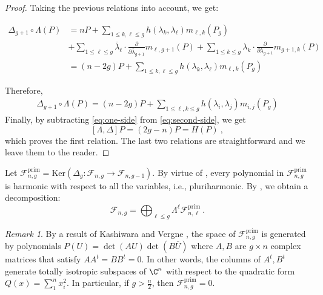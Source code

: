 \documentclass[11pt,letterpaper,english]{amsart}
\numberwithin{equation}{subsection}
\numberwithin{equation}{section}
\newcommand\cF{{\mathcal F}}
\theoremstyle{plain}
\theoremstyle{remark}
\newtheorem{remarque}[theorem]{Remark}
\begin{document}
\begin{proof}
  Taking the previous relations into account, we get: 
  
       \begin{align*}
        \Delta_{g+1}\circ\Lambda( P)&= nP+\sum_{1\leq k,\ell\leq g}h(\lambda_k,\lambda_\ell)m_{\ell,k}(P_g)\\
        &+\sum_{1\leq \ell\leq g}\overline{\lambda}_\ell\cdot \frac{\partial}{\partial \overline{\lambda}_{g+1}}m_{\ell,g+1}(P)+\sum_{1\leq k\leq g}\lambda_k\cdot \frac{\partial}{\partial \lambda_{g+1}}m_{g+1,k}(P) \\
        &=(n-2g)P+\sum_{1\leq k,\ell\leq g}h(\lambda_k,\lambda_\ell)m_{\ell,k}(P_g)
   \end{align*}
 
Therefore,
\begin{align}\label{eq:one-side}
     \Delta_{g+1}\circ\Lambda(P)=(n-2g)P+\sum_{1\leq \ell,k\leq g}h(\lambda_i,\lambda_j)m_{i,j}(P_g)
\end{align}
   Finally, by subtracting \cref{eq:one-side} from \cref{eq:second-side}, we get
   \[[\Lambda,\Delta]P=(2g-n)P =H(P)~,\]
which proves the first relation. The last two relations are straightforward and we leave them to the reader.
\end{proof}

Let $\cF_{n,g}^{\mathrm{prim}}=\mathrm{Ker}(\Delta_g:\cF_{n,g}\rightarrow \cF_{n,g-1})$. By virtue of , every polynomial in $\cF_{n,g}^{\mathrm{prim}}$ is harmonic with respect to all the variables, i.e., pluriharmonic. By , we obtain a decomposition:
\[\cF_{n,g}=\bigoplus_{\ell\leq g}\Lambda^\ell\cF_{n,\ell}^{\mathrm{prim}}~.\]
\begin{remarque}\label{r:kashiwara-vergne}
By a result of Kashiwara and Vergne \cite{ kashiwara_segal-shale-weil_1978}, the space of $\cF_{n,g}^{\mathrm{prim}}$ is generated by polynomials $P(U)=\det(AU)\det(B\overline{U})$ where $A,B$ are $g\times n$ complex matrices that satisfy $AA^t=BB^t=0$. In other words, the columns of $A^t,B^t$ generate totally isotropic subspaces of $\C^n$ with respect to the quadratic form $Q(x)=\sum_1^nx_i^2$. In particular, if $g>\frac{n}{2}$, then $\cF_{n,g}^{\mathrm{prim}}=0$. 
\end{remarque}
\end{document}
